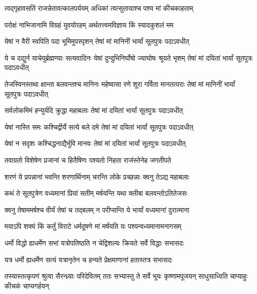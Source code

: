 \twolineshloka
{त्वद्गृहावसतिं राजन्नेतावत्कालपर्ययम्}
{अधिकां त्वत्सुतायाश्च पश्य मां कीचकाहताम्}




\twolineshloka
{परोक्षं नाभिजानामि विग्रहं युवयोरहम्}
{अर्थतत्त्वमविज्ञाय किं स्यादकुशलं मम}




\twolineshloka
{येषां न वैरी स्वपिति पदा भूमिमुपस्पृशन्}
{तेषां मां मानिनीं भार्यां सूतपुत्रः पदाऽवधीत्}


\threelineshloka
{ये च दद्युर्न याचेयुर्ब्रह्मण्याः सत्यवादिनः}
{येषां दुन्दुभिनिर्घोषो ज्याघोषः श्रूयते भृशम्}
{तेषां मां दयितां भार्यां सूतपुत्रः पदाऽवधीत्}


\threelineshloka
{तेजस्विनस्तथा क्षान्ता बलवन्तश्च मानिनः}
{महेष्वासा रणे शूरा गर्विता मानतत्पराः}
{तेषां मां मानिनीं भार्यां सूतपुत्रः पदाऽवधीत्}


\twolineshloka
{सर्वलोकमिमं हन्युर्यदि क्रुद्धा महाबलाः}
{तेषां मां दयितां भार्यां सूतपुत्रः पदाऽवधीत्}


\twolineshloka
{येषां नास्ति समः कश्चिद्वीर्ये सत्ये बले दमे}
{तेषां मां दयितां भार्यां सूतपुत्रः पदाऽवधीत्}


\twolineshloka
{येषां न सदृशः कश्चिद्धनाद्यैर्भुवि मानवः}
{तेषां मां दयितां भार्यां सूतपुत्रः पदाऽवधीत्}


\twolineshloka
{तवाग्रतो विशेषेण प्रजानां च हितैषिणः}
{पश्यतो निहता राजंस्तेनेह जगतीपते}


\twolineshloka
{शरणं ये प्रपन्नानां भवन्ति शरणार्थिनाम्}
{चरन्ति लोके प्रच्छन्नाः क्वनु तेऽद्य महाबलाः}


\twolineshloka
{कथं ते सूतपुत्रेण वध्यमानां प्रियां सतीम्}
{मर्षयन्ति यथा क्लीबा बलवन्तोऽतितेजसः}


\twolineshloka
{क्वनु तेषाममर्षश्च वीर्यं तेषां च तद्बलम्}
{न परीप्सन्ति ये भार्यां वध्यमानां दुरात्माना}


\twolineshloka
{मयाऽपि शक्यं किं कर्तुं विराटे धर्मदूषणे}
{मां मर्षंयति यः पश्यन्वध्यमानामनागसम्}


\twolineshloka
{धर्मो विद्धो ह्यधर्मेण सभां यत्रोपतिष्ठति}
{न चेद्विशल्यः क्रियते सर्वे विद्धाः सभासदः}


\twolineshloka
{यत्र धर्मो ह्यधर्मेण सत्यं यत्रानृतेन च}
{हन्यते प्रेक्षमाणानां हतास्तत्र सभासदः}



\threelineshloka
{तस्यास्तत्कृपणं श्रुत्वा सैरन्ध्र्याः परिदेवितम्}
{ततः सभ्यास्तु ते सर्वे भूयः कृष्णामपूजयन्}
{साधुसाध्विति चाप्याहुः कीचकं चाप्यगर्हयन्}


